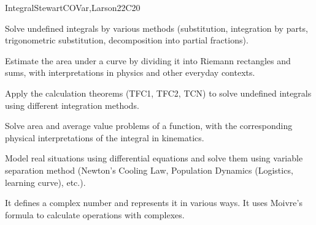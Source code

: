 \begin{syllabus}
\begin{unit}{Integral}{}{StewartCOVar,Larson}{22}{C20}
   \begin{learningoutcomes}
      \item Solve undefined integrals by various methods (substitution, integration by parts, trigonometric substitution, decomposition into partial fractions).
      \item Estimate the area under a curve by dividing it into Riemann rectangles and sums, with interpretations in physics and other everyday contexts.  
      \item Apply the calculation theorems (TFC1, TFC2, TCN) to solve undefined integrals using different integration methods.
      \item Solve area and average value problems of a function, with the corresponding physical interpretations of the integral in kinematics.
      \item Model real situations using differential equations and solve them using variable separation method (Newton's Cooling Law, Population Dynamics (Logistics, learning curve), etc.).
      \item It defines a complex number and represents it in various ways. It uses Moivre's formula to calculate operations with complexes.
   \end{learningoutcomes}
\end{unit}

\begin{coursebibliography}
\end{coursebibliography}

\end{syllabus}
